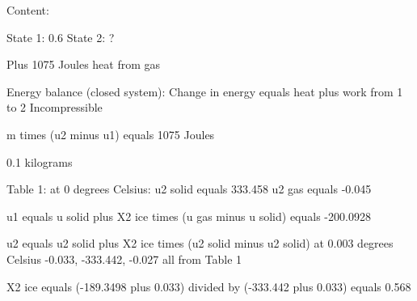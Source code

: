 Content:

State 1: 0.6  
State 2: ?  

Plus 1075 Joules heat from gas

Energy balance (closed system):  
Change in energy equals heat plus work from 1 to 2  
Incompressible

m times (u2 minus u1) equals 1075 Joules  

0.1 kilograms  

Table 1: at 0 degrees Celsius:  
u2 solid equals 333.458  
u2 gas equals -0.045  

u1 equals u solid plus X2 ice times (u gas minus u solid)  
equals -200.0928  

u2 equals u2 solid plus X2 ice times (u2 solid minus u2 solid) at 0.003 degrees Celsius  
-0.033, -333.442, -0.027 all from Table 1  

X2 ice equals (-189.3498 plus 0.033) divided by (-333.442 plus 0.033)  
equals 0.568